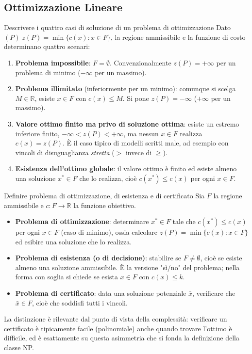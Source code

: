 \documentclass[12pt]{extarticle} %
\begin{document}
\subsection{Ottimizzazione Lineare}

\begin{teoriabox}{Descrivere i quattro casi di soluzione di un problema di ottimizzazione}
Dato $(P) \; z(P) = \min\{c(x) : x \in F\}$, la regione ammissibile e la funzione di costo determinano quattro scenari:
\begin{enumerate}
    \item \textbf{Problema impossibile}: $F = \emptyset$. Convenzionalmente $z(P) = +\infty$ per un problema di minimo ($-\infty$ per un massimo).
    \item \textbf{Problema illimitato} (inferiormente per un minimo): comunque si scelga $M \in \mathbb{R}$, esiste $x \in F$ con $c(x) \le M$. Si pone $z(P) = -\infty$ ($+\infty$ per un massimo).
    \item \textbf{Valore ottimo finito ma privo di soluzione ottima}: esiste un estremo inferiore finito, $-\infty < z(P) < +\infty$, ma nessun $x \in F$ realizza $c(x) = z(P)$. È il caso tipico di modelli scritti male, ad esempio con vincoli di disuguaglianza \textit{stretta} ($>$ invece di $\ge$).
    \item \textbf{Esistenza dell'ottimo globale}: il valore ottimo è finito ed esiste almeno una soluzione $x^* \in F$ che lo realizza, cioè $c(x^*) \le c(x)$ per ogni $x \in F$.
\end{enumerate}
\end{teoriabox}

\begin{teoriabox}{Definire problema di ottimizzazione, di esistenza e di certificato}
Sia $F$ la regione ammissibile e $c: F \to \mathbb{R}$ la funzione obiettivo.
\begin{itemize}
    \item \textbf{Problema di ottimizzazione}: determinare $x^* \in F$ tale che $c(x^*) \le c(x)$ per ogni $x \in F$ (caso di minimo), ossia calcolare $z(P) = \min\{c(x) : x \in F\}$ ed esibire una soluzione che lo realizza.
    \item \textbf{Problema di esistenza (o di decisione)}: stabilire se $F \ne \emptyset$, cioè se esiste almeno una soluzione ammissibile. È la versione "sì/no" del problema; nella forma con soglia si chiede se esista $x \in F$ con $c(x) \le k$.
    \item \textbf{Problema di certificato}: data una soluzione potenziale $\bar{x}$, verificare che $\bar{x} \in F$, cioè che soddisfi tutti i vincoli.
\end{itemize}
La distinzione è rilevante dal punto di vista della complessità: verificare un certificato è tipicamente facile (polinomiale) anche quando trovare l'ottimo è difficile, ed è esattamente su questa asimmetria che si fonda la definizione della classe NP.
\end{teoriabox}
\end{document}
